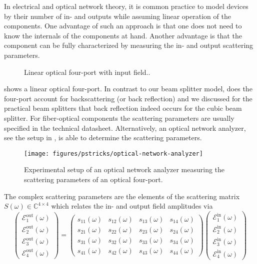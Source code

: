 In electrical and optical network theory, it is common practice to model devices by their number of in- and outputs while assuming linear operation of the components.
One advantage of such an approach is that one does not need to know the internals of the components at hand.
Another advantage is that the component can be fully characterized by measuring the in- and output scattering parameters.
\begin{figure}[htb]
    \centering
    
    \caption{Linear optical four-port with input field..}\label{fig:four_port}
\end{figure}
 shows a linear optical four-port.
In contrast to our beam splitter model, does the four-port account for backscattering (or back reflection) and we discussed for the practical beam splitters that back reflection indeed occurs for the cubic beam splitter.
For fiber-optical components the scattering parameters are usually specified in the technical datasheet.
Alternatively, an optical network analyzer, see the setup in , is able to determine the scattering parameters.
\begin{figure}[htb]
    \centering
    \texttt{[image: figures/pstricks/optical-network-analyzer]}
    \caption{Experimental setup of an optical network analyzer measuring the scattering parameters of an optical four-port.}\label{fig:optical_network_analyzer}
\end{figure}
The complex scattering parameters are the elements of the scattering matrix $S(\omega)\in\mathbb{C}^{4\times4}$ which relates the in- and output field amplitudes via
\begin{equation}
    \begin{pmatrix}
        \mathcal{E}_{1}^\text{out}(\omega) \\
        \mathcal{E}_{2}^\text{out}(\omega) \\
        \mathcal{E}_{3}^\text{out}(\omega) \\
        \mathcal{E}_{4}^\text{out}(\omega)
    \end{pmatrix}
    =
    \begin{pmatrix}
    	s_{11}(\omega) & s_{12}(\omega) & s_{13}(\omega) & s_{14}(\omega) \\
    	s_{21}(\omega) & s_{22}(\omega) & s_{23}(\omega) & s_{24}(\omega) \\
    	s_{31}(\omega) & s_{32}(\omega) & s_{33}(\omega) & s_{34}(\omega) \\
    	s_{41}(\omega) & s_{42}(\omega) & s_{43}(\omega) & s_{44}(\omega)
    \end{pmatrix}
    \begin{pmatrix}
        \mathcal{E}_{1}^\text{in}(\omega) \\
        \mathcal{E}_{2}^\text{in}(\omega) \\
        \mathcal{E}_{3}^\text{in}(\omega) \\
        \mathcal{E}_{4}^\text{in}(\omega)
    \end{pmatrix}
\end{equation}
